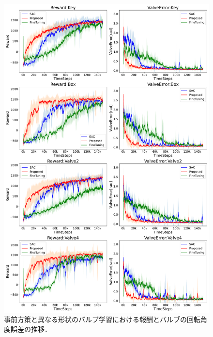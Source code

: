 \documentclass[dvipdfmx]{ampbt_nomag}
\begin{document}
\begin{figure}[htbp]
  \centering
  \includegraphics[width=16cm]
       {asset/img/SimTurn180Other.pdf}
  \caption{事前方策と異なる形状のバルブ学習における報酬とバルブの回転角度誤差の推移．}
  \label{LeaningCurve_Other_Sim}
\end{figure}
\end{document}
